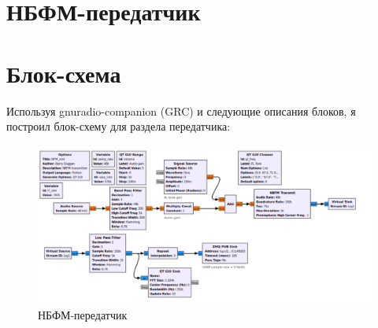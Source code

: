 \documentclass[12pt]{article}
\begin{document}
\section*{НБФМ-передатчик} 

\section*{Блок-схема} 

Используя gnuradio-companion (GRC) и следующие описания блоков, я построил блок-схему для раздела передатчика:

\begin{figure}[H]
    \centering
    \includegraphics[width=1\textwidth]{pictures/2.png}
    \caption{НБФМ-передатчик}
\end{figure}
\end{document}
